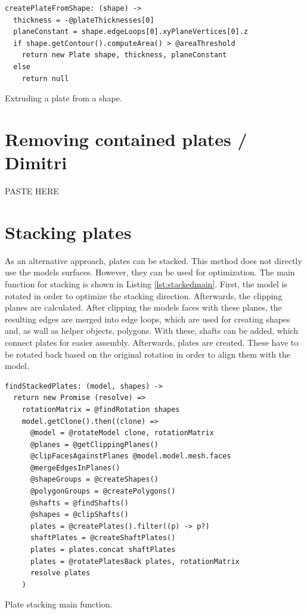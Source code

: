 \documentclass[../ClassicThesis.tex]{subfiles}
\begin{document}
\begin{listing}[ht]
\begin{verbatim}
createPlateFromShape: (shape) ->
  thickness = -@plateThicknesses[0]
  planeConstant = shape.edgeLoops[0].xyPlaneVertices[0].z
  if shape.getContour().computeArea() > @areaThreshold
    return new Plate shape, thickness, planeConstant
  else
    return null
\end{verbatim}
\caption{Extruding a plate from a shape.}
\label{lst:extrude}
\end{listing}

\section{Removing contained plates / Dimitri}

PASTE HERE

\section{Stacking plates}

As an alternative approach, plates can be stacked. This method does not directly use the models surfaces. However, they can be used for optimization.
The main function for stacking is shown in Listing \ref{lst:stackedmain}. First, the model is rotated in order to optimize the stacking direction. Afterwards, the clipping planes are calculated. After clipping the models faces with these planes, the resulting edges are merged into edge loops, which are used for creating shapes and, as wall as helper objects, polygons. With these, shafts can be added, which connect plates for easier assembly. Afterwards, plates are created. These have to be rotated back based on the original rotation in order to align them with the model. 

\begin{listing}[ht]
\begin{verbatim}
findStackedPlates: (model, shapes) ->
  return new Promise (resolve) =>
    rotationMatrix = @findRotation shapes
    model.getClone().then((clone) =>
      @model = @rotateModel clone, rotationMatrix
      @planes = @getClippingPlanes()
      @clipFacesAgainstPlanes @model.model.mesh.faces
      @mergeEdgesInPlanes()
      @shapeGroups = @createShapes()
      @polygonGroups = @createPolygons()
      @shafts = @findShafts()
      @shapes = @clipShafts()
      plates = @createPlates().filter((p) -> p?)
      shaftPlates = @createShaftPlates()
      plates = plates.concat shaftPlates
      plates = @rotatePlatesBack plates, rotationMatrix
      resolve plates
    )
\end{verbatim}
\caption{Plate stacking main function.}
\label{lst:stackedmain}
\end{listing}
\end{document}
